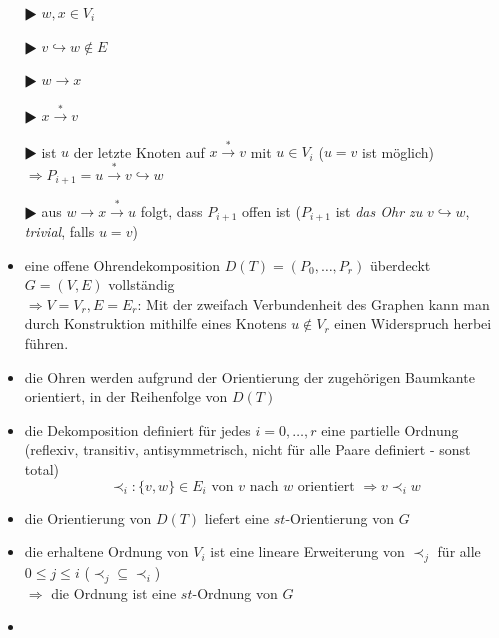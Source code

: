 \begin{itemize}[itemsep=-1pt]
\begin{itemize}[itemsep=-1pt]
\begin{enumerate}[itemsep=-1pt]
						\begin{minipage}{0.4\textwidth}
							
						\end{minipage}
						\begin{minipage}{0.55\textwidth}
							\begin{itemize}
								\item[$\RHD$] $w,x\in V_i$ 
								\item[$\RHD$] $v\hookrightarrow w\notin E$
								\item[$\RHD$] $w\rightarrow x$
								\item[$\RHD$] $x\overset{*}{\rightarrow}v$
								\item[$\RHD$] ist $u$ der letzte Knoten auf $x\overset{*}{\rightarrow}v$ mit $u\in V_i$ ($u=v$ ist möglich)\\
								$\Rightarrow P_{i+1}=u\overset{*}{\rightarrow}v\hookrightarrow w$
								\item[$\RHD$] aus $w\rightarrow x\overset{*}{\rightarrow}u$ folgt, dass $P_{i+1}$ offen ist ($P_{i+1}$ ist \textit{das Ohr zu} $v\hookrightarrow w$, \textit{trivial}, falls $u=v$)
							\end{itemize}
						\end{minipage}
				\end{enumerate}
		\end{itemize}
\end{itemize}
\topbreak
\vspace*{-2\baselineskip}
\begin{itemize}[itemsep=-1pt]
	\item eine offene Ohrendekomposition $D(T)=(P_0,\dots,P_r)$ überdeckt $G=(V,E)$ vollständig\\
	$\Rightarrow V=V_r,E=E_r$:
		\vspace*{-1.5\baselineskip}
		\ProofIdea
		\vspace*{-\baselineskip}
			Mit der zweifach Verbundenheit des Graphen kann man durch Konstruktion mithilfe eines Knotens $u\notin V_r$ einen Widerspruch herbei führen.
	\item die Ohren werden aufgrund der Orientierung der zugehörigen Baumkante orientiert, in der Reihenfolge von $D(T)$
	\item die Dekomposition definiert für jedes $i=0,\dots, r$ eine partielle Ordnung (reflexiv, transitiv, antisymmetrisch, nicht für alle Paare definiert - sonst total)
	\[\prec_i : \{v,w\}\in E_i \text{ von }v\text{ nach }w\text{ orientiert }\Rightarrow v\prec_i w\]
	\item die Orientierung von $D(T)$ liefert eine $st$-Orientierung von $G$
	\item die erhaltene Ordnung von $V_i$ ist eine lineare Erweiterung von $\prec_j$ für alle $0\leq j\leq i$ ($\prec_j\subseteq \prec_i$)\\
	$\Rightarrow$ die Ordnung ist eine $st$-Ordnung von $G$
	\item \algobreak{}
\end{itemize}

